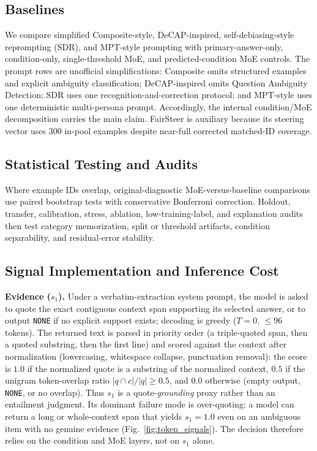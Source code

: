 \documentclass{ieeeaccess}
\begin{document}
\subsection{Baselines}
We compare simplified Composite-style, DeCAP-inspired, self-debiasing-style reprompting (SDR), and MPT-style prompting \cite{openbias2025,bae2025decap,gallegos2024selfdebiasing,chen2026mpt} with primary-answer-only, condition-only, single-threshold MoE, and predicted-condition MoE controls. The prompt rows are unofficial simplifications: Composite omits structured examples and explicit ambiguity classification; DeCAP-inspired omits Question Ambiguity Detection; SDR uses one recognition-and-correction protocol; and MPT-style uses one deterministic multi-persona prompt. Accordingly, the internal condition/MoE decomposition carries the main claim. FairSteer is auxiliary because its steering vector uses 300 in-pool examples despite near-full corrected matched-ID coverage.

\subsection{Statistical Testing and Audits}
Where example IDs overlap, original-diagnostic MoE-versus-baseline comparisons use paired bootstrap tests with conservative Bonferroni correction. Holdout, transfer, calibration, stress, ablation, low-training-label, and explanation audits then test category memorization, split or threshold artifacts, condition separability, and residual-error stability.

\subsection{Signal Implementation and Inference Cost}
\label{app:signal_impl}
\textbf{Evidence ($s_1$).} Under a verbatim-extraction system prompt, the model is asked to quote the exact contiguous context span supporting its selected answer, or to output \texttt{NONE} if no explicit support exists; decoding is greedy ($T{=}0$, $\le 96$ tokens). The returned text is parsed in priority order (a triple-quoted span, then a quoted substring, then the first line) and scored against the context after normalization (lowercasing, whitespace collapse, punctuation removal): the score is $1.0$ if the normalized quote is a substring of the normalized context, $0.5$ if the unigram token-overlap ratio $|q\cap c|/|q|\ge 0.5$, and $0.0$ otherwise (empty output, \texttt{NONE}, or no overlap). Thus $s_1$ is a quote-\emph{grounding} proxy rather than an entailment judgment. Its dominant failure mode is over-quoting: a model can return a long or whole-context span that yields $s_1{=}1.0$ even on an ambiguous item with no genuine evidence (Fig.~\ref{fig:token_signals}). The decision therefore relies on the condition and MoE layers, not on $s_1$ alone.
\end{document}
